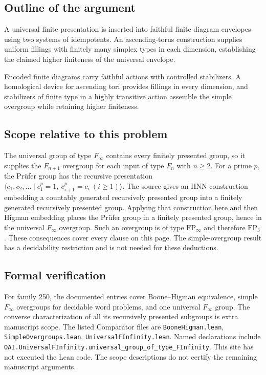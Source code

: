 \documentclass[11pt]{article}
\begin{document}
\subsection{Outline of the argument}
A universal finite presentation is inserted into faithful finite diagram envelopes using two systems of idempotents. An ascending-torus construction supplies uniform fillings with finitely many simplex types in each dimension, establishing the claimed higher finiteness of the universal envelope.

Encoded finite diagrams carry faithful actions with controlled stabilizers. A homological device for ascending tori provides fillings in every dimension, and stabilizers of finite type in a highly transitive action assemble the simple overgroup while retaining higher finiteness.

\subsection{Scope relative to this problem}
The universal group of type $F_\infty$ contains every finitely presented group, so it supplies the $F_{n+1}$ overgroup for each input of type $F_n$ with $n\ge2$. For a prime $p$, the Prüfer group has the recursive presentation $\langle c_1,c_2,\ldots\mid c_1^p=1,\ c_{i+1}^p=c_i\ (i\ge1)\rangle$. The source gives an HNN construction embedding a countably generated recursively presented group into a finitely generated recursively presented group. Applying that construction here and then Higman embedding places the Prüfer group in a finitely presented group, hence in the universal $F_\infty$ overgroup. Such an overgroup is of type $\mathrm{FP}_\infty$ and therefore $\mathrm{FP}_3$. These consequences cover every clause on this page. The simple-overgroup result has a decidability restriction and is not needed for these deductions.

\subsection{Formal verification}
For family 250, the documented entries cover Boone--Higman equivalence, simple $F_\infty$ overgroups for decidable word problems, and one universal $F_\infty$ group. The converse characterization of all its recursively presented subgroups is extra manuscript scope. The listed Comparator files are \texttt{BooneHigman.lean}, \texttt{SimpleOvergroups.lean}, \texttt{UniversalFInfinity.lean}. Named declarations include \texttt{OAI.UniversalFInfinity.universal\_group\_of\_type\_FInfinity}. This site has not executed the Lean code. The scope descriptions do not certify the remaining manuscript arguments.
\end{document}
